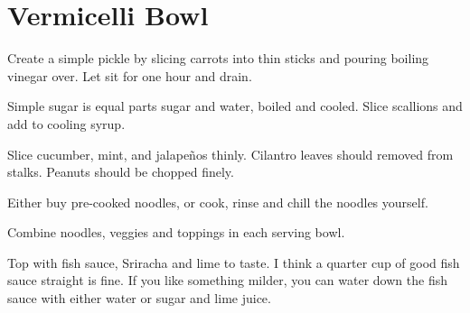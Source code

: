 
\section{Vermicelli Bowl}
\begin{recipe}


Create a simple pickle by slicing carrots into thin sticks and pouring boiling vinegar over. Let sit for one hour and drain.


Simple sugar is equal parts sugar and water, boiled and cooled. Slice scallions and add to cooling syrup.


Slice cucumber, mint, and jalapeños thinly. Cilantro leaves should removed from stalks. Peanuts should be chopped finely.


Either buy pre-cooked noodles, or cook, rinse and chill the noodles yourself.

Combine noodles, veggies and toppings in each serving bowl.


Top with fish sauce, Sriracha and lime to taste. I think a quarter cup of good fish sauce straight is fine. If you like something milder, you can water down the fish sauce with either water or sugar and lime juice.


\end{recipe}
